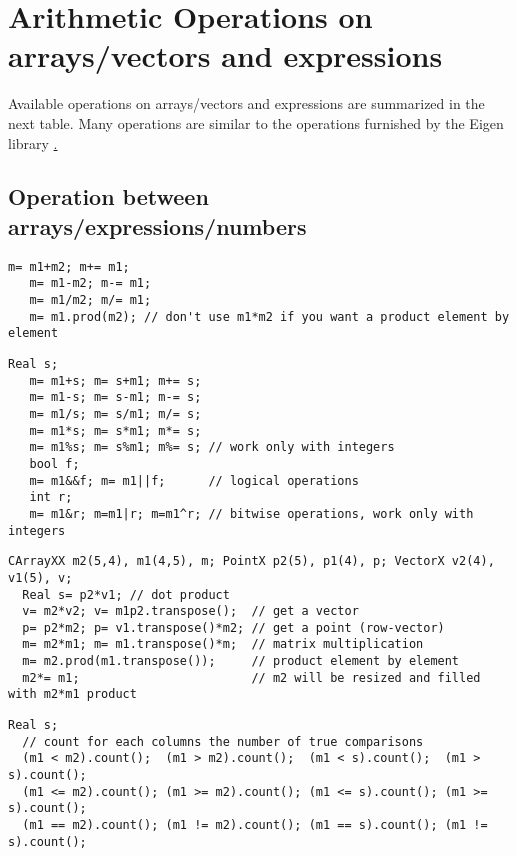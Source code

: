 \documentclass[a4paper,10pt]{article}
\begin{document}
\section{Arithmetic Operations on arrays/vectors and expressions}

Available operations on arrays/vectors and expressions are summarized in the
next table. Many operations are similar to the operations
furnished by the Eigen library \href{http://eigen.tuxfamily.org/}.

\subsection{Operation between arrays/expressions/numbers}
\begin{lstlisting}[style=customcpp,caption={add, subtract, divide, multiply arrays element by element}]
   m= m1+m2; m+= m1;
   m= m1-m2; m-= m1;
   m= m1/m2; m/= m1;
   m= m1.prod(m2); // don't use m1*m2 if you want a product element by element
\end{lstlisting}

\begin{lstlisting}[style=customcpp,caption={add, subtract, divide, multiply by a number}]
   Real s;
   m= m1+s; m= s+m1; m+= s;
   m= m1-s; m= s-m1; m-= s;
   m= m1/s; m= s/m1; m/= s;
   m= m1*s; m= s*m1; m*= s;
   m= m1%s; m= s%m1; m%= s; // work only with integers
   bool f;
   m= m1&&f; m= m1||f;      // logical operations
   int r;
   m= m1&r; m=m1|r; m=m1^r; // bitwise operations, work only with integers
\end{lstlisting}

\begin{lstlisting}[style=customcpp,caption=matrix by matrix/vector products]
  CArrayXX m2(5,4), m1(4,5), m; PointX p2(5), p1(4), p; VectorX v2(4), v1(5), v;
  Real s= p2*v1; // dot product
  v= m2*v2; v= m1p2.transpose();  // get a vector
  p= p2*m2; p= v1.transpose()*m2; // get a point (row-vector)
  m= m2*m1; m= m1.transpose()*m;  // matrix multiplication
  m= m2.prod(m1.transpose());     // product element by element
  m2*= m1;                        // m2 will be resized and filled with m2*m1 product
\end{lstlisting}

\begin{lstlisting}[style=customcpp,caption=Comparisons operators]
  Real s;
  // count for each columns the number of true comparisons
  (m1 < m2).count();  (m1 > m2).count();  (m1 < s).count();  (m1 > s).count();
  (m1 <= m2).count(); (m1 >= m2).count(); (m1 <= s).count(); (m1 >= s).count();
  (m1 == m2).count(); (m1 != m2).count(); (m1 == s).count(); (m1 != s).count();
\end{lstlisting}
\end{document}
